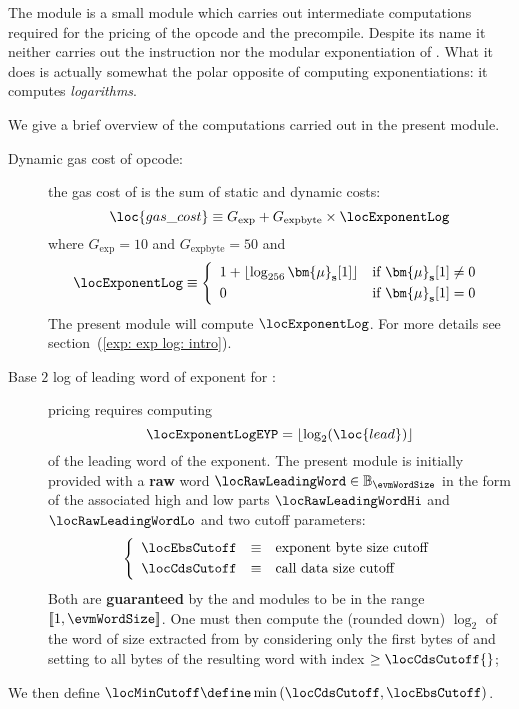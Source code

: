 The \expMod{} module is a small module which carries out intermediate computations required for the pricing of the  opcode and the \instModexp{} precompile.
Despite its name it neither carries out the  instruction nor the modular exponentiation of \instModexp{}.
What it does is actually somewhat the polar opposite of computing exponentiations: it computes \emph{logarithms}.

We give a brief overview of the computations carried out in the present module.
\begin{description}
	\item[Dynamic gas cost of  opcode:]
		the gas cost of  is the sum of static and dynamic costs:
		\[
			\loc{gas\_cost} \equiv G_\text{exp} + G_\text{expbyte} \times \locExponentLog \\
		\]
		where $G_\text{exp} = 10$ and $G_{\text{expbyte}} = 50$
		and
		\[
			\locExponentLog \equiv
			\left\{ \begin{array}{ll}
				1 + \lfloor \log_{256} \bm{\mu}_\textbf{s}[1] \rfloor & \text{if $\bm{\mu}_\textbf{s}[1] \neq 0$}  \vspace{1mm} \\
				0                                                     & \text{if $\bm{\mu}_\textbf{s}[1] = 0$}                  \\
			\end{array} \right. \\
		\]
		The present module will compute $\locExponentLog$. For more details see section~(\ref{exp: exp log: intro}).
	\item[Base $2$ log of leading word of exponent for \instModexp{}:]
		\instModexp{} pricing requires computing
		\[ \locExponentLogEYP = \lfloor \log_{2}(\loc{lead}) \rfloor \]
		of the leading word of the exponent.
		The present module is initially provided with a \textbf{raw} \evm{} word
		$\locRawLeadingWord \in \mathbb{B}_{\evmWordSize}$ in the form of the associated high and low parts
		$\locRawLeadingWordHi$ and $\locRawLeadingWordLo$
		  and two cutoff parameters:
		\[
			\left\{ \begin{array}{lcl}
				\locEbsCutoff & \equiv & \text{exponent byte size cutoff} \vspace{1mm} \\
				\locCdsCutoff & \equiv & \text{call data size cutoff}                  \\
			\end{array} \right.
		\]
		Both are \textbf{guaranteed} by the \hubMod{} and \oobMod{} modules to be in the range $[\![ 1, \evmWordSize ]\!]$.
		One must then compute the (rounded down) $\log_{2}$ of the word of size \locEbsCutoff{} extracted from  by considering only the first \locCdsCutoff{} bytes of  and setting to  all bytes of the resulting word with index $\geq \locCdsCutoff{}$;
\end{description}



We then define $\locMinCutoff \define \min{(\locCdsCutoff,\locEbsCutoff)}$.
